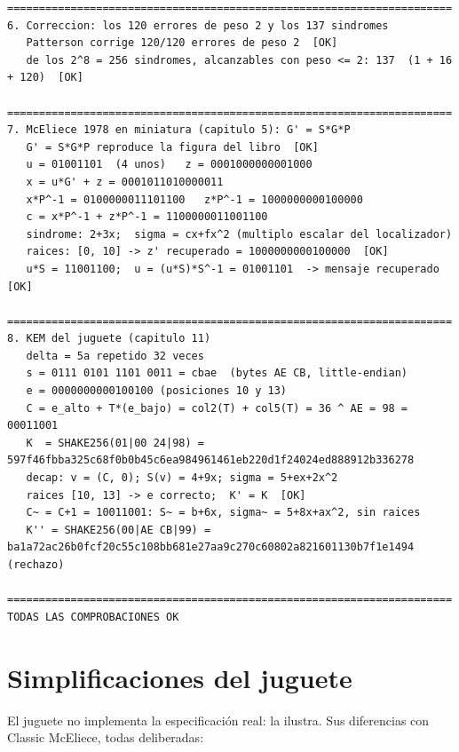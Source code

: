\documentclass[11pt,a4paper,oneside]{report}
\begin{document}
\begin{lstlisting}[numbers=none]
======================================================================
6. Correccion: los 120 errores de peso 2 y los 137 sindromes
   Patterson corrige 120/120 errores de peso 2  [OK]
   de los 2^8 = 256 sindromes, alcanzables con peso <= 2: 137  (1 + 16 + 120)  [OK]

======================================================================
7. McEliece 1978 en miniatura (capitulo 5): G' = S*G*P
   G' = S*G*P reproduce la figura del libro  [OK]
   u = 01001101  (4 unos)   z = 0001000000001000
   x = u*G' + z = 0001011010000011
   x*P^-1 = 0100000011101100   z*P^-1 = 1000000000100000
   c = x*P^-1 + z*P^-1 = 1100000011001100
   sindrome: 2+3x;  sigma = cx+fx^2 (multiplo escalar del localizador)
   raices: [0, 10] -> z' recuperado = 1000000000100000  [OK]
   u*S = 11001100;  u = (u*S)*S^-1 = 01001101  -> mensaje recuperado  [OK]

======================================================================
8. KEM del juguete (capitulo 11)
   delta = 5a repetido 32 veces
   s = 0111 0101 1101 0011 = cbae  (bytes AE CB, little-endian)
   e = 0000000000100100 (posiciones 10 y 13)
   C = e_alto + T*(e_bajo) = col2(T) + col5(T) = 36 ^ AE = 98 = 00011001
   K  = SHAKE256(01|00 24|98) = 597f46fbba325c68f0b0b45c6ea984961461eb220d1f24024ed888912b336278
   decap: v = (C, 0); S(v) = 4+9x; sigma = 5+ex+2x^2
   raices [10, 13] -> e correcto;  K' = K  [OK]
   C~ = C+1 = 10011001: S~ = b+6x, sigma~ = 5+8x+ax^2, sin raices
   K'' = SHAKE256(00|AE CB|99) = ba1a72ac26b0fcf20c55c108bb681e27aa9c270c60802a821601130b7f1e1494  (rechazo)

======================================================================
TODAS LAS COMPROBACIONES OK
\end{lstlisting}

\section{Simplificaciones del juguete}

El juguete no implementa la especificación real: la ilustra. Sus
diferencias con Classic McEliece, todas deliberadas:
\end{document}
